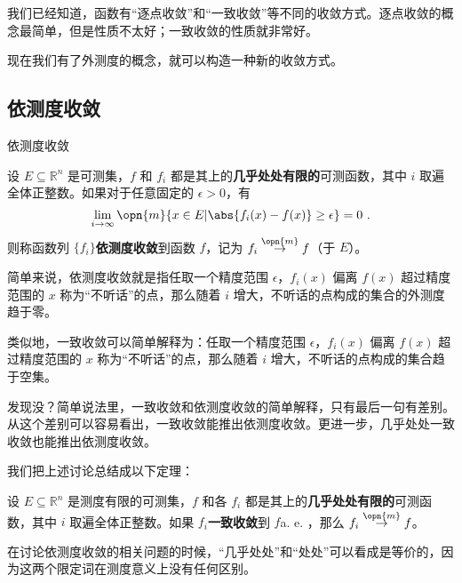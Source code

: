 

我们已经知道，函数有“逐点收敛”和“一致收敛”等不同的收敛方式。逐点收敛的概念最简单，但是性质不太好；一致收敛的性质就非常好。

现在我们有了外测度的概念，就可以构造一种新的收敛方式。

\subsection{依测度收敛}

\begin{definition}{依测度收敛}

设 $E\subseteq \mathbb{R}^n$ 是可测集，$f$ 和 $f_i$ 都是其上的\textbf{几乎处处有限的}可测函数，其中 $i$ 取遍全体正整数。如果对于任意固定的 $\epsilon>0$，有
\begin{equation}
\lim\limits_{i\to\infty}\opn{m}\{x\in E|\abs{f_i(x)-f(x)}\geq\epsilon\}=0~.
\end{equation}
则称函数列 $\{f_i\}$\textbf{依测度收敛}到函数 $f$，记为 $f_i\overset{\opn{m}}\to f$（于 $E$）。

\end{definition}

简单来说，依测度收敛就是指任取一个精度范围 $\epsilon$，$f_i(x)$ 偏离 $f(x)$ 超过精度范围的 $x$ 称为“不听话”的点，那么随着 $i$ 增大，不听话的点构成的集合的外测度趋于零。

类似地，一致收敛可以简单解释为：任取一个精度范围 $\epsilon$，$f_i(x)$ 偏离 $f(x)$ 超过精度范围的 $x$ 称为“不听话”的点，那么随着 $i$ 增大，不听话的点构成的集合趋于空集。

发现没？简单说法里，一致收敛和依测度收敛的简单解释，只有最后一句有差别。从这个差别可以容易看出，一致收敛能推出依测度收敛。更进一步，几乎处处一致收敛也能推出依测度收敛。

我们把上述讨论总结成以下定理：



\begin{theorem}{}\label{LimMs_the2}

设 $E\subseteq \mathbb{R}^n$ 是测度有限的可测集，$f$ 和各 $f_i$ 都是其上的\textbf{几乎处处有限的}可测函数，其中 $i$ 取遍全体正整数。如果 $f_i$\textbf{一致收敛}到 $f$a. e.  ，那么 $f_i\overset{\opn{m}}\to f$。

\end{theorem}



在讨论依测度收敛的相关问题的时候，“几乎处处”和“处处”可以看成是等价的，因为这两个限定词在测度意义上没有任何区别。


